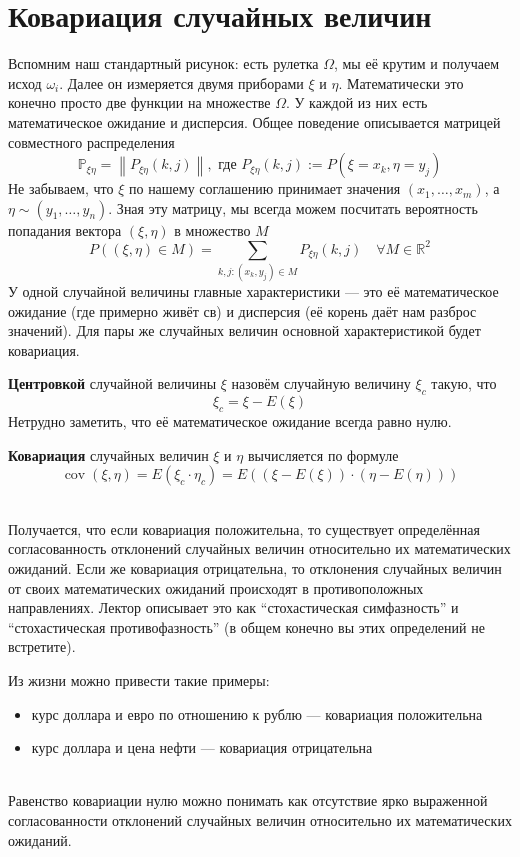 \documentclass[11pt]{article}
\DeclareMathOperator{\Cov}{cov}
\begin{document}
\section{Ковариация случайных величин}

Вспомним наш стандартный рисунок: есть рулетка $\Omega$, мы её крутим и получаем исход $\omega_i$. 
Далее он измеряется двумя приборами $\xi$ и $\eta$. Математически это конечно просто две функции на множестве $\Omega$. 
У каждой из них есть математическое ожидание и дисперсия. Общее поведение описывается матрицей совместного распределения
\[\mathbb{P}_{\xi\eta} = \left\lVert P_{\xi\eta}(k, j) \right\rVert, \text{ где } P_{\xi\eta}(k, j) := P(\xi = x_k, \eta = y_j)\]
Не забываем, что $\xi$ по нашему соглашению принимает значения $(x_1, \ldots, x_m)$, а $\eta \sim (y_1, \ldots, y_n)$. 
Зная эту матрицу, мы всегда можем посчитать вероятность попадания вектора $(\xi, \eta)$ в множество $M$
\[P((\xi, \eta) \in M) = \sum_{k, j: (x_k, y_j) \in M} P_{\xi\eta}(k, j) \quad \forall M \in \mathbb{R}^2\]
У одной случайной величины главные характеристики --- это её математическое ожидание (где примерно живёт св) и 
дисперсия (её корень даёт нам разброс значений). Для пары же случайных величин основной характеристикой будет ковариация.

\begin{definition}
    \textbf{Центровкой} случайной величины $\xi$ назовём случайную величину $\xi_c$ такую, что 
    \[\xi_c = \xi - E(\xi)\]
    Нетрудно заметить, что её математическое ожидание всегда равно нулю.
\end{definition}

\begin{definition}
    \textbf{Ковариация} случайных величин $\xi$ и $\eta$ вычисляется по формуле
    \[\Cov(\xi, \eta) = E(\xi_c \cdot \eta_c) = E((\xi - E(\xi)) \cdot (\eta - E(\eta)))\] 
\end{definition} \leavevmode
\\
Получается, что если ковариация положительна, то существует определённая согласованность отклонений случайных величин относительно их математических ожиданий. 
Если же ковариация отрицательна, то отклонения случайных величин от своих математических ожиданий происходят в противоположных направлениях. 
Лектор описывает это как ``стохастическая симфазность'' и ``стохастическая противофазность'' (в общем конечно вы этих определений не встретите).

\begin{example}
    Из жизни можно привести такие примеры: 
    \begin{itemize}
        \item курс доллара и евро по отношению к рублю --- ковариация положительна 
        \item курс доллара и цена нефти --- ковариация отрицательна
    \end{itemize}
\end{example} \leavevmode
\\
Равенство ковариации нулю можно понимать как отсутствие ярко выраженной согласованности отклонений случайных величин относительно их математических ожиданий.
\end{document}
